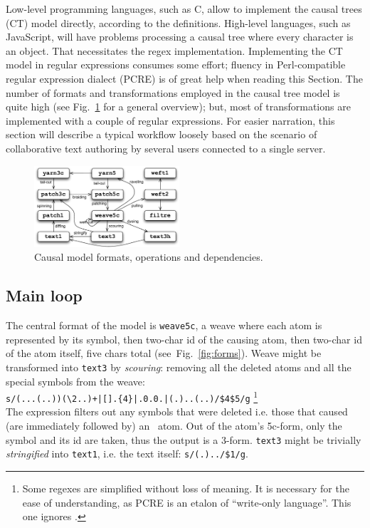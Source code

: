 \documentclass{acm_proc_article-sp}
\begin{document}
Low-level programming languages, such as C, allow to implement the  causal trees (CT) model directly, according to the definitions.
High-level languages, such as JavaScript, will have problems processing a causal tree where every character is an object.
That necessitates the regex implementation.
Implementing the CT model in regular expressions consumes some effort; fluency in Perl-compatible regular expression dialect (PCRE) is of great help when reading this Section. 
The number of formats and transformations employed in the causal tree model is quite high (see Fig.~\ref{fig:ops} for a general overview); but, most of transformations are implemented with a couple of regular expressions. 
For easier narration, this section will describe a typical workflow loosely based on the scenario of collaborative text authoring by several users connected to a single server.

\begin{figure}[t] \label{fig:ops}
\includegraphics[width=0.48\textwidth]{operations.pdf}
\caption{Causal model formats, operations and dependencies.} \label{fig:ops}
\end{figure}

\subsection{Main loop}

The central format of the model is {\tt weave5c}, a weave where each atom is represented by its symbol, then two-char id of the causing atom, then two-char id of the atom itself, five chars total (see~Fig.~\ref{fig:forms}).
Weave might be transformed into {\tt text3} by \emph{scouring}: removing all the deleted atoms and all the special symbols from the weave: \\
{\small \verb`s/(...(..))(`\bsp\verb`\2..)+|[`\bsp\zero\verb`].{4}|.0.0.|(.)..(..)/$4$5/g`}
\footnote{Some regexes are simplified without loss of meaning. It is necessary for the ease of understanding, as PCRE is an etalon of ``write-only language''. This one ignores \cnc.}\\
The expression filters out any symbols that were deleted i.e. those that caused (are immediately followed by) an \bsp ~atom.
Out of the atom's 5c-form, only the symbol and its id are taken, thus the output is a 3-form.
{\tt text3} might be trivially \emph{stringified} into {\tt text1}, i.e. the text itself: {\small \verb`s/(.)../$1/g`}.
\end{document}

